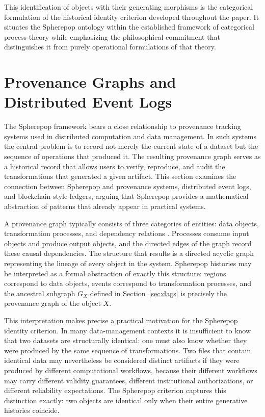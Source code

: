 \documentclass[12pt]{article}
\theoremstyle{plain}
\theoremstyle{definition}
\theoremstyle{remark}
\begin{document}
This identification of objects with their generating morphisms is the
categorical formulation of the historical identity criterion developed
throughout the paper.  It situates the Spherepop ontology within the
established framework of categorical process theory while emphasizing the
philosophical commitment that distinguishes it from purely operational
formulations of that theory.


\section{Provenance Graphs and Distributed Event Logs}
\label{sec:provenance}

The Spherepop framework bears a close relationship to provenance tracking
systems used in distributed computation and data management.  In such systems
the central problem is to record not merely the current state of a dataset but
the sequence of operations that produced it.  The resulting provenance graph
serves as a historical record that allows users to verify, reproduce, and audit
the transformations that generated a given artifact.  This section examines the
connection between Spherepop and provenance systems, distributed event logs,
and blockchain-style ledgers, arguing that Spherepop provides a mathematical
abstraction of patterns that already appear in practical systems.

A provenance graph typically consists of three categories of entities: data
objects, transformation processes, and dependency relations \citep{Spivak2014}.
Processes consume input objects and produce output objects, and the directed
edges of the graph record these causal dependencies.  The structure that results
is a directed acyclic graph representing the lineage of every object in the
system.  Spherepop histories may be interpreted as a formal abstraction of
exactly this structure: regions correspond to data objects, events correspond
to transformation processes, and the ancestral subgraph $G_X$ defined in
Section~\ref{sec:dags} is precisely the provenance graph of the object $X$.

This interpretation makes precise a practical motivation for the Spherepop
identity criterion.  In many data-management contexts it is insufficient to
know that two datasets are structurally identical; one must also know whether
they were produced by the same sequence of transformations.  Two files that
contain identical data may nevertheless be considered distinct artifacts if
they were produced by different computational workflows, because their different
workflows may carry different validity guarantees, different institutional
authorizations, or different reliability expectations.  The Spherepop criterion
captures this distinction exactly: two objects are identical only when their
entire generative histories coincide.
\end{document}
